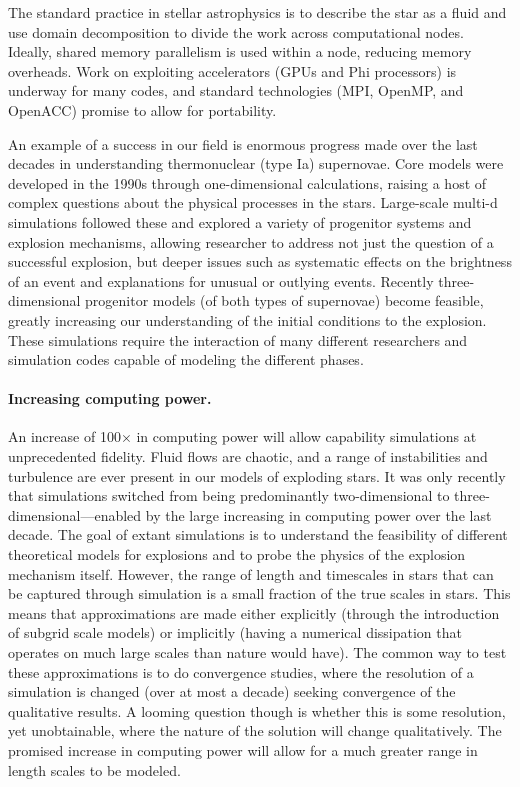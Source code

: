\documentclass[11pt,twocolumn]{article}
\begin{document}
The standard practice in stellar astrophysics is to describe the star
as a fluid and use domain decomposition to divide the work across
computational nodes.  Ideally, shared memory parallelism is used
within a node, reducing memory overheads.  Work on exploiting
accelerators (GPUs and Phi processors) is underway for many codes, and
standard technologies (MPI, OpenMP, and OpenACC) promise to allow for
portability.

An example of a success in our field is enormous progress made over
the last decades in understanding thermonuclear (type Ia) supernovae.
Core models were developed in the 1990s through one-dimensional
calculations, raising a host of complex questions about the physical
processes in the stars.  Large-scale multi-d simulations followed
these and explored a variety of progenitor systems and explosion
mechanisms, allowing researcher to address not just the question of a
successful explosion, but deeper issues such as systematic effects on
the brightness of an event and explanations for unusual or outlying
events.  Recently three-dimensional progenitor models (of both types
of supernovae) become feasible, greatly increasing our understanding
of the initial conditions to the explosion.  These simulations require
the interaction of many different researchers and simulation codes
capable of modeling the different phases.

\paragraph*{Increasing computing power.}

An increase of 100$\times$ in computing power will allow capability
simulations at unprecedented fidelity. Fluid flows are chaotic, and a
range of instabilities and turbulence are ever present in our models
of exploding stars. It was only recently that simulations switched
from being predominantly two-dimensional to
three-dimensional---enabled by the large increasing in computing power
over the last decade.  The goal of extant simulations is to understand
the feasibility of different theoretical models for explosions and to
probe the physics of the explosion mechanism itself.  However, the
range of length and timescales in stars that can be captured through
simulation is a small fraction of the true scales in stars.  This
means that approximations are made either explicitly (through the
introduction of subgrid scale models) or implicitly (having a
numerical dissipation that operates on much large scales than nature
would have).  The common way to test these approximations is to do
convergence studies, where the resolution of a simulation is changed
(over at most a decade) seeking convergence of the qualitative
results.  A looming question though is whether this is some
resolution, yet unobtainable, where the nature of the solution will
change qualitatively.  The promised increase in computing power will
allow for a much greater range in length scales to be modeled.
\end{document}
